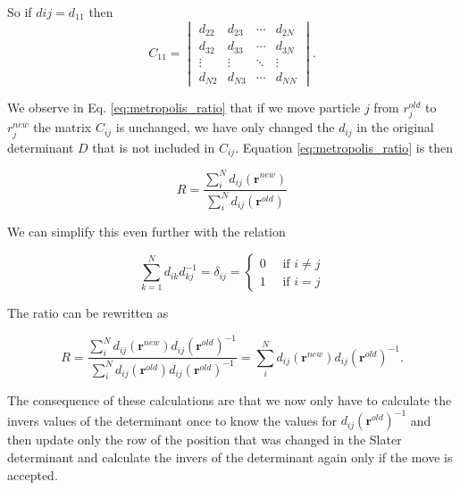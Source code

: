 So if $d{ij} = d_{11}$ then 
\begin{equation*}
C_{11} = 
 \begin{vmatrix}
 d_{22} & d_{23} & \cdots & d_{2N} \\
  d_{32} & d_{33} & \cdots & d_{3N} \\
  \vdots  & \vdots  & \ddots & \vdots  \\
  d_{N2} & d_{N3} & \cdots & d_{NN} 
 \end{vmatrix}.
\end{equation*}


We observe in Eq. \ref{eq:metropolis_ratio} that if we move particle $j$ from $r_j^{old}$ to $r_j^{new}$ the matrix $C_{ij}$ is unchanged, we have only changed the $d_{ij}$ in the original determinant $D$ that is not included in $C_{ij}$. Equation \ref{eq:metropolis_ratio} is then

\begin{equation}
R = \frac{\sum_i^N d_{ij}(\bm{r}^{new})}{\sum_i^N d_{ij}(\bm{r}^{old})}
\end{equation}

We can simplify this even further with the relation

\begin{equation}
\sum_{k=1}^N d_{ik}^{}d_{kj}^{-1} = \delta_{ij} = \left\{ \begin{matrix}
0 \quad \text{ if } i \neq j \\
1 \quad \text{ if } i = j
\end{matrix} \right. 
\end{equation}

The ratio can be rewritten as

\begin{equation}
R = \frac{\sum_i^N d_{ij}(\bm{r}^{new})d_{ij}(\bm{r}^{old})^{-1}}{\sum_i^N d_{ij}(\bm{r}^{old})d_{ij}(\bm{r}^{old})^{-1}} = \sum_i^N d_{ij}(\bm{r}^{new})d_{ij}(\bm{r}^{old})^{-1}.
\end{equation}

The consequence of these calculations are that we now only have to calculate the invers values of the determinant once to know the values for $d_{ij}(\bm{r}^{old})^{-1}$ and then update only the row of the position that was changed in the Slater determinant and calculate the invers of the determinant again only if the move is accepted. 

